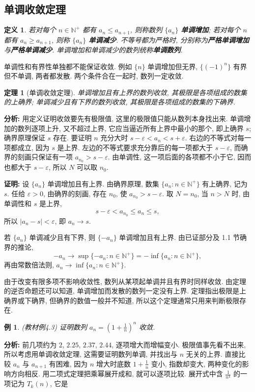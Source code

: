\documentclass[UTF8,openany]{ctexbook}
\theoremstyle{chinesetextbook}
\newtheorem{definition}{定义}[section]
\newtheorem{example}{例}[section]
\newtheorem{theorem}{定理}[section]
\newenvironment{cnproof}{\par\indent\textbf{证明:} \ignorespaces}{\par}
\begin{document}
\subsection{单调收敛定理}
\begin{definition}
若对每个 $n\in\mathbb N^+$ 都有 $a_n\le a_{n+1}$, 则称数列 $\{a_n\}$ \textbf{单调增加}; 若对每个 $n$ 都有 $a_n\ge a_{n+1}$, 则称 $\{a_n\}$ \textbf{单调减少}. 不等号都为严格时, 分别称为\textbf{严格单调增加}与\textbf{严格单调减少}. 单调增加和单调减少的数列统称\textbf{单调数列}.
\end{definition}
单调性和有界性单独都不能保证收敛. 例如 $\{n\}$ 单调增加但无界, $\{(-1)^n\}$ 有界但不单调, 两者都发散. 两个条件合在一起时, 数列一定收敛.
\begin{theorem}[单调收敛定理]
单调增加且有上界的数列收敛, 其极限是各项组成的数集的上确界; 单调减少且有下界的数列收敛, 其极限是各项组成的数集的下确界.
\end{theorem}
\par\indent\textbf{分析:} 用定义证明收敛要先有极限值, 这里的极限值只能从数列本身找出来. 单调增加的数列逐项上升, 又不超过上界, 它应当逼近所有上界中最小的那个, 即上确界 $s$; 确界原理保证 $s$ 存在. 要证明 $n$ 充分大时 $s-\varepsilon<a_n<s+\varepsilon$. 右边的不等式对每一项都成立, 因为 $s$ 是上界. 左边的不等式要求充分靠后的每一项都大于 $s-\varepsilon$, 而确界的刻画只保证有一项 $a_{n_0}>s-\varepsilon$. 由单调性, 这一项后面的各项都不小于它, 因而也都大于 $s-\varepsilon$, 所以 $N$ 可以取 $n_0$.
\begin{cnproof}
设 $\{a_n\}$ 单调增加且有上界. 由确界原理, 数集 $\{a_n:n\in\mathbb N^+\}$ 有上确界, 记为 $s$. 任给 $\varepsilon>0$, 由确界的刻画, 存在 $n_0$, 使 $a_{n_0}>s-\varepsilon$. 取 $N=n_0$, 当 $n>N$ 时, 由单调性和 $s$ 是上界,
\[
s-\varepsilon<a_{n_0}\le a_n\le s,
\]
所以 $|a_n-s|<\varepsilon$, 即 $a_n\to s$.

若 $\{a_n\}$ 单调减少且有下界, 则 $\{-a_n\}$ 单调增加且有上界. 由已证部分及 1.1 节确界的推论,
\[
-a_n\to\sup\{-a_n:n\in\mathbb N^+\}=-\inf\{a_n:n\in\mathbb N^+\},
\]
再由常数倍法则, $a_n\to\inf\{a_n:n\in\mathbb N^+\}$.
\end{cnproof}
由于改变有限多项不影响收敛性, 数列从某项起单调并且有界时同样收敛. 由定理的逆否命题还可以知道, 单调增加而发散的数列一定没有上界. 定理指出极限是上确界或下确界, 但确界的数值一般并不知道, 所以这个定理通常只用来判断极限存在.
\begin{example}\label{ex:4-3}
\textnormal{(教材例4.3)} 证明数列 $\displaystyle a_n=\left(1+\frac1n\right)^n$ 收敛.
\end{example}
\par\indent\textbf{分析:} 前几项约为 $2$, $2.25$, $2.37$, $2.44$, 逐项增大而增幅变小. 极限值事先看不出来, 所以考虑用单调收敛定理, 这需要证明数列单调, 并找出与 $n$ 无关的上界. 直接比较 $a_n$ 与 $a_{n+1}$ 有困难, 因为 $n$ 增大时底数 $\displaystyle1+\frac1n$ 变小, 指数却变大, 两种变化的影响方向相反. 用二项式定理把乘幂展开成和, 就可以逐项比较. 展开式中含 $\displaystyle\frac1{n^k}$ 的一项记为 $T_k(n)$, 它是
\end{document}
